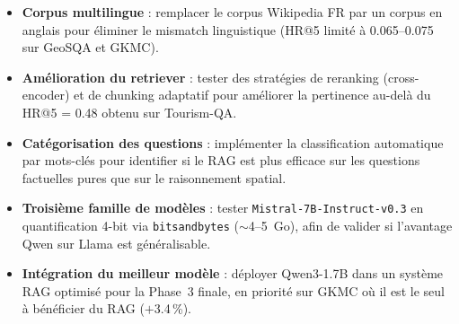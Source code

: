 \documentclass[12pt,a4paper]{article}
\begin{document}
\begin{itemize}[leftmargin=*]
  \item \textbf{Corpus multilingue} : remplacer le corpus Wikipedia FR par un corpus en
  anglais pour \'eliminer le mismatch linguistique (HR@5 limit\'e \`a 0.065--0.075 sur
  GeoSQA et GKMC).
  \item \textbf{Am\'elioration du retriever} : tester des strat\'egies de reranking
  (cross-encoder) et de chunking adaptatif pour am\'eliorer la pertinence au-del\`a
  du HR@5 = 0.48 obtenu sur Tourism-QA.
  \item \textbf{Cat\'egorisation des questions} : impl\'ementer la classification
  automatique par mots-cl\'es pour identifier si le RAG est plus efficace sur les
  questions factuelles pures que sur le raisonnement spatial.
  \item \textbf{Troisi\`eme famille de mod\`eles} : tester \texttt{Mistral-7B-Instruct-v0.3}
  en quantification 4-bit via \texttt{bitsandbytes} ($\sim$4--5~Go), afin de valider si
  l'avantage Qwen sur Llama est g\'en\'eralisable.
  \item \textbf{Int\'egration du meilleur mod\`ele} : d\'eployer Qwen3-1.7B dans un
  syst\`eme RAG optimis\'e pour la Phase~3 finale, en priorit\'e sur GKMC o\`u il est
  le seul \`a b\'en\'eficier du RAG ($+$3.4\,\%).
\end{itemize}

\newpage


\end{document}
